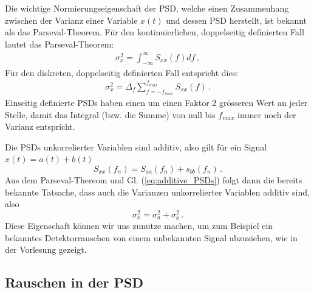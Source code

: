 Die wichtige Normierungseigenschaft der PSD, welche einen Zusammenhang zwischen der Varianz einer Variable $x(t)$ und dessen PSD herstellt, ist bekannt als das Parseval-Theorem. F\"ur 
den kontinuierlichen, doppelseitig definierten Fall lautet das Parseval-Theorem:
\begin{align}
\sigma_x^2 = \int_{- \infty}^\infty S_{xx} (f) df\,,
\label{eq:vl7-8}
\end{align}
F\"ur den diskreten, doppelseitig definierten Fall entspricht dies:
\begin{align}
\sigma_x^2 = \Delta_f \sum_{f = -f_{max}}^{f_{max}} S_{xx} (f)\,.
\label{eq:vl7-9}
\end{align}
Einseitig definierte PSDs haben einen um einen Faktor 2 gr\"osseren Wert an jeder Stelle, damit das Integral (bzw. die Summe) von null bis $f_{max}$ immer noch der Varianz entspricht.

Die PSDs unkorrelierter Variablen sind additiv, also gilt für ein Signal $x(t) = a(t) + b(t)$
\begin{equation}
        S_{xx}(f_n) = S_{aa}(f_n) + s_{bb}(f_n) \,.\label{eq:additive_PSDs}
\end{equation}
Aus dem Parseval-Thereom und Gl. (\ref{eq:additive_PSDs}) folgt dann die bereits bekannte Tatsache, dass auch die Varianzen unkorrelierter Variablen additiv sind, also 
\begin{equation}
    \sigma_x^2 = \sigma_a^2 + \sigma_b^2\,.
\end{equation}
Diese Eigenschaft können wir uns zunutze machen, um zum Beispiel ein bekanntes Detektorrauschen von einem unbekannten Signal abzuziehen, wie in der Vorlesung gezeigt. 

\subsection{Rauschen in der PSD}
\label{subsec:vl10}



